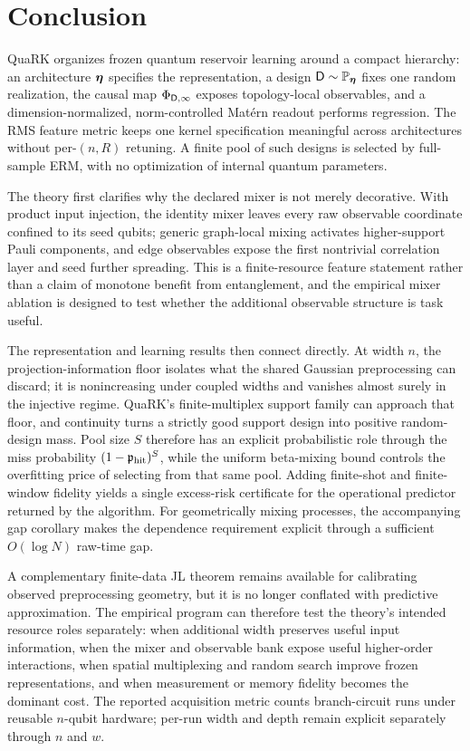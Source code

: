 \section{Conclusion}
\label{sec:conclusion}

QuaRK organizes frozen quantum reservoir learning around a compact hierarchy:
an architecture $\bm{\eta}$ specifies the representation, a design
$\mathsf D\sim\mathbb P_{\bm{\eta}}$ fixes one random realization, the causal map
$\Phi_{\mathsf D,\infty}$ exposes topology-local observables, and a
dimension-normalized, norm-controlled Mat\'ern readout performs regression.
The RMS feature metric keeps one kernel specification meaningful across
architectures without per-$(n,R)$ retuning.  A finite pool of such designs is
selected by full-sample ERM, with no optimization of internal quantum
parameters.

The theory first clarifies why the declared mixer is not merely decorative.
With product input injection, the identity mixer leaves every raw observable
coordinate confined to its seed qubits; generic graph-local mixing activates
higher-support Pauli components, and edge observables expose the first
nontrivial correlation layer and seed further spreading.  This is a
finite-resource feature statement rather than a claim of monotone benefit from
entanglement, and the empirical mixer ablation is designed to test whether the
additional observable structure is task useful.

The representation and learning results then connect directly.  At width $n$,
the projection-information floor isolates what the shared
Gaussian preprocessing can discard; it is nonincreasing under coupled widths
and vanishes almost surely in the injective regime.  QuaRK's finite-multiplex
support family can approach that floor, and continuity turns a strictly good
support design into positive random-design mass.  Pool size $S$ therefore has
an explicit probabilistic role through the miss probability
$(1-\mathfrak p_{\mathrm{hit}})^S$, while the uniform beta-mixing bound controls the
overfitting price of selecting from that same pool.  Adding finite-shot and
finite-window fidelity yields a single excess-risk certificate for the
operational predictor returned by the algorithm.  For geometrically mixing
processes, the accompanying gap corollary makes the dependence requirement
explicit through a sufficient $O(\log N)$ raw-time gap.

A complementary finite-data JL theorem remains available for calibrating
observed preprocessing geometry, but it is no longer conflated with predictive
approximation.  The empirical program can therefore test the theory's intended
resource roles separately: when additional width preserves useful input
information, when the mixer and observable bank expose useful higher-order interactions,
when spatial multiplexing and random search improve frozen representations,
and when measurement or memory fidelity becomes the dominant cost.  The
reported acquisition metric counts branch-circuit runs under reusable $n$-qubit
hardware; per-run width and depth remain explicit separately through $n$ and
$w$.
